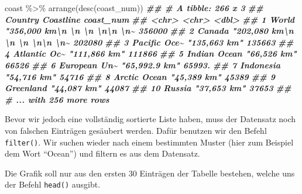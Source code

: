 \documentclass[
  ngerman,
]{article}
\newenvironment{Shaded}{\begin{snugshade}}{\end{snugshade}}
\newcommand{\DocumentationTok}[1]{\textcolor[rgb]{0.56,0.35,0.01}{\textbf{\textit{#1}}}}
\newcommand{\FunctionTok}[1]{\textcolor[rgb]{0.00,0.00,0.00}{#1}}
\newcommand{\NormalTok}[1]{#1}
\newcommand{\SpecialCharTok}[1]{\textcolor[rgb]{0.00,0.00,0.00}{#1}}
\begin{document}
\begin{Shaded}
\begin{Highlighting}[]
\NormalTok{coast }\SpecialCharTok{\%\textgreater{}\%}
  \FunctionTok{arrange}\NormalTok{(}\FunctionTok{desc}\NormalTok{(coast\_num))}
\DocumentationTok{\#\# \# A tibble: 266 x 3}
\DocumentationTok{\#\#    Country      Coastline                                              coast\_num}
\DocumentationTok{\#\#    \textless{}chr\textgreater{}        \textless{}chr\textgreater{}                                                      \textless{}dbl\textgreater{}}
\DocumentationTok{\#\#  1 World        "356,000 km\textbackslash{}n          \textbackslash{}n          \textbackslash{}n        \textbackslash{}n\textbackslash{}n  \textbackslash{}n\textasciitilde{}   356000 }
\DocumentationTok{\#\#  2 Canada       "202,080 km\textbackslash{}n          \textbackslash{}n          \textbackslash{}n        \textbackslash{}n\textbackslash{}n  \textbackslash{}n\textasciitilde{}   202080 }
\DocumentationTok{\#\#  3 Pacific Oce\textasciitilde{} "135,663 km"                                             135663 }
\DocumentationTok{\#\#  4 Atlantic Oc\textasciitilde{} "111,866 km"                                             111866 }
\DocumentationTok{\#\#  5 Indian Ocean "66,526 km"                                               66526 }
\DocumentationTok{\#\#  6 European Un\textasciitilde{} "65,992.9 km"                                             65993.}
\DocumentationTok{\#\#  7 Indonesia    "54,716 km"                                               54716 }
\DocumentationTok{\#\#  8 Arctic Ocean "45,389 km"                                               45389 }
\DocumentationTok{\#\#  9 Greenland    "44,087 km"                                               44087 }
\DocumentationTok{\#\# 10 Russia       "37,653 km"                                               37653 }
\DocumentationTok{\#\# \# ... with 256 more rows}
\end{Highlighting}
\end{Shaded}

Bevor wir jedoch eine vollständig sortierte Liste haben, muss der Datensatz noch von falschen Einträgen gesäubert werden. Dafür benutzen wir den Befehl \texttt{filter()}. Wir suchen wieder nach einem bestimmten Muster (hier zum Beispiel dem Wort ``Ocean'') und filtern es aus dem Datensatz.

Die Grafik soll nur aus den ersten 30 Einträgen der Tabelle bestehen, welche uns der Befehl \texttt{head()} ausgibt.
\end{document}
